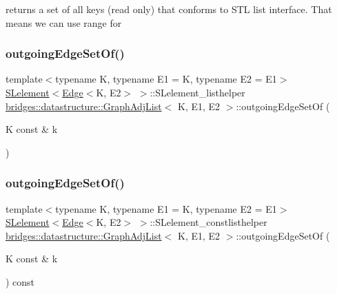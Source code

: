 returns a set of all keys (read only) that conforms to S\+TL list interface. That means we can use range for \mbox{\label{classbridges_1_1datastructure_1_1_graph_adj_list_ac066da800ab88dc2e55a89650e08bb78}} 
\subsubsection{\texorpdfstring{outgoing\+Edge\+Set\+Of()}{outgoingEdgeSetOf()}\hspace{0.1cm}{\footnotesize\ttfamily [1/2]}}
{\footnotesize\ttfamily template$<$typename K, typename E1 = K, typename E2 = E1$>$ \\
\hyperlink{classbridges_1_1datastructure_1_1_s_lelement}{S\+Lelement}$<$\hyperlink{classbridges_1_1datastructure_1_1_edge}{Edge}$<$K, E2$>$ $>$\+::S\+Lelement\+\_\+listhelper \hyperlink{classbridges_1_1datastructure_1_1_graph_adj_list}{bridges\+::datastructure\+::\+Graph\+Adj\+List}$<$ K, E1, E2 $>$\+::outgoing\+Edge\+Set\+Of (\begin{DoxyParamCaption}\item[{K const \&}]{k }\end{DoxyParamCaption})\hspace{0.3cm}{\ttfamily [inline]}}

\mbox{\label{classbridges_1_1datastructure_1_1_graph_adj_list_ab0677da029442194925f8167cc2b8638}} 
\subsubsection{\texorpdfstring{outgoing\+Edge\+Set\+Of()}{outgoingEdgeSetOf()}\hspace{0.1cm}{\footnotesize\ttfamily [2/2]}}
{\footnotesize\ttfamily template$<$typename K, typename E1 = K, typename E2 = E1$>$ \\
\hyperlink{classbridges_1_1datastructure_1_1_s_lelement}{S\+Lelement}$<$\hyperlink{classbridges_1_1datastructure_1_1_edge}{Edge}$<$K, E2$>$ $>$\+::S\+Lelement\+\_\+constlisthelper \hyperlink{classbridges_1_1datastructure_1_1_graph_adj_list}{bridges\+::datastructure\+::\+Graph\+Adj\+List}$<$ K, E1, E2 $>$\+::outgoing\+Edge\+Set\+Of (\begin{DoxyParamCaption}\item[{K const \&}]{k }\end{DoxyParamCaption}) const\hspace{0.3cm}{\ttfamily [inline]}}

